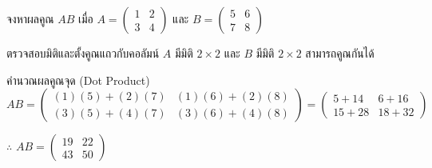 \begin{ex}
\label{ex:matrix-multiply-2x2}
จงหาผลคูณ $AB$ เมื่อ $A = \begin{pmatrix} 1 & 2 \\ 3 & 4 \end{pmatrix}$ และ $B = \begin{pmatrix} 5 & 6 \\ 7 & 8 \end{pmatrix}$
\end{ex}
\begin{solution}
ตรวจสอบมิติและตั้งคูณแถวกับคอลัมน์ $A$ มีมิติ $2 \times 2$ และ $B$ มีมิติ $2 \times 2$ สามารถคูณกันได้

คำนวณผลคูณจุด (Dot Product) \[ AB = \begin{pmatrix} (1)(5)+(2)(7) & (1)(6)+(2)(8) \\ (3)(5)+(4)(7) & (3)(6)+(4)(8) \end{pmatrix} = \begin{pmatrix} 5+14 & 6+16 \\ 15+28 & 18+32 \end{pmatrix} \]

$\therefore$ $AB = \begin{pmatrix} 19 & 22 \\ 43 & 50 \end{pmatrix}$ \solhere
\end{solution}

